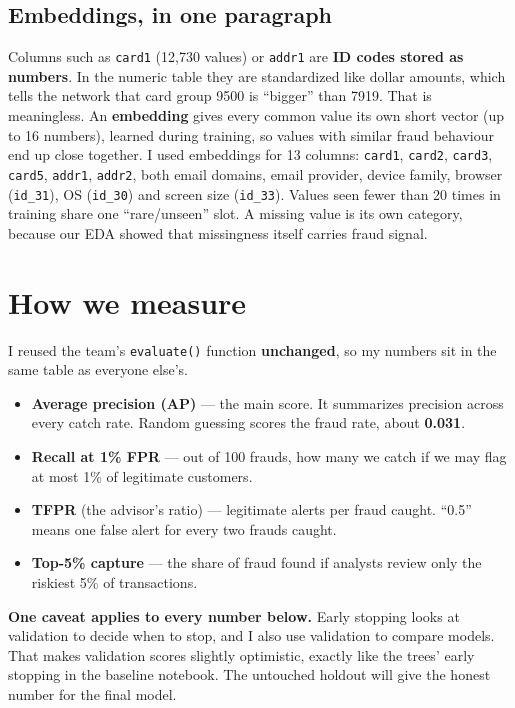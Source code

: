 \documentclass[11pt]{article}
\newcommand{\note}[2][panel]{\par\noindent\colorbox{#1}{\parbox{\dimexpr\linewidth-2\fboxsep}{\vspace{4pt}#2\vspace{4pt}}}\par}
\begin{document}
\subsection{Embeddings, in one paragraph}
Columns such as \texttt{card1} (12,730 values) or \texttt{addr1} are \textbf{ID codes stored as numbers}. In the numeric table they are standardized like dollar amounts, which tells the network that card group 9500 is ``bigger'' than 7919. That is meaningless. An \textbf{embedding} gives every common value its own short vector (up to 16 numbers), learned during training, so values with similar fraud behaviour end up close together. I used embeddings for 13 columns: \texttt{card1}, \texttt{card2}, \texttt{card3}, \texttt{card5}, \texttt{addr1}, \texttt{addr2}, both email domains, email provider, device family, browser (\texttt{id\_31}), OS (\texttt{id\_30}) and screen size (\texttt{id\_33}). Values seen fewer than 20 times in training share one ``rare/unseen'' slot. A missing value is its own category, because our EDA showed that missingness itself carries fraud signal.

\section{How we measure}
I reused the team's \texttt{evaluate()} function \textbf{unchanged}, so my numbers sit in the same table as everyone else's.
\begin{itemize}
\item \textbf{Average precision (AP)} --- the main score. It summarizes precision across every catch rate. Random guessing scores the fraud rate, about \textbf{0.031}.
\item \textbf{Recall at 1\% FPR} --- out of 100 frauds, how many we catch if we may flag at most 1\% of legitimate customers.
\item \textbf{TFPR} (the advisor's ratio) --- legitimate alerts per fraud caught. ``0.5'' means one false alert for every two frauds caught.
\item \textbf{Top-5\% capture} --- the share of fraud found if analysts review only the riskiest 5\% of transactions.
\end{itemize}

\note{\textbf{One caveat applies to every number below.} Early stopping looks at validation to decide when to stop, and I also use validation to compare models. That makes validation scores slightly optimistic, exactly like the trees' early stopping in the baseline notebook. The untouched holdout will give the honest number for the final model.}
\end{document}
